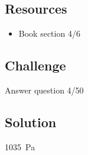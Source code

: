 \subsection*{Resources}
\begin{itemize}
    \item Book section 4/6
\end{itemize}

\subsection*{Challenge}
Answer question 4/50

\subsection*{Solution}
\SI{1035}{\pascal}




%
%
%
%
%
%
%



